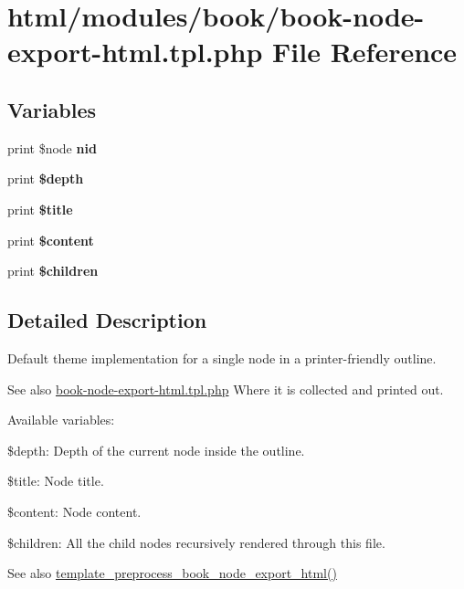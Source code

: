 \hypertarget{book-node-export-html_8tpl_8php}{
\section{html/modules/book/book-\/node-\/export-\/html.tpl.php File Reference}
\label{book-node-export-html_8tpl_8php}
}
\subsection*{Variables}
\begin{DoxyCompactItemize}
\item 
\hypertarget{book-node-export-html_8tpl_8php_aff83bc4c67cdf5b085d181488eea273f}{
print \$node {\bfseries nid}}
\label{book-node-export-html_8tpl_8php_aff83bc4c67cdf5b085d181488eea273f}

\item 
\hypertarget{book-node-export-html_8tpl_8php_a35f688394dd229d173c03c68c439f569}{
print {\bfseries \$depth}}
\label{book-node-export-html_8tpl_8php_a35f688394dd229d173c03c68c439f569}

\item 
\hypertarget{book-node-export-html_8tpl_8php_aec2795512d255332f57cacd930a090b4}{
print {\bfseries \$title}}
\label{book-node-export-html_8tpl_8php_aec2795512d255332f57cacd930a090b4}

\item 
\hypertarget{book-node-export-html_8tpl_8php_ab7b7210f43aa78e34f0b202de894a74c}{
print {\bfseries \$content}}
\label{book-node-export-html_8tpl_8php_ab7b7210f43aa78e34f0b202de894a74c}

\item 
\hypertarget{book-node-export-html_8tpl_8php_a82162d46cc50277bcd0aa897f1314edd}{
print {\bfseries \$children}}
\label{book-node-export-html_8tpl_8php_a82162d46cc50277bcd0aa897f1314edd}

\end{DoxyCompactItemize}


\subsection{Detailed Description}
Default theme implementation for a single node in a printer-\/friendly outline.

\begin{DoxySeeAlso}{See also}
\hyperlink{book-node-export-html_8tpl_8php}{book-\/node-\/export-\/html.tpl.php} Where it is collected and printed out.
\end{DoxySeeAlso}
Available variables:
\begin{DoxyItemize}
\item \$depth: Depth of the current node inside the outline.
\item \$title: Node title.
\item \$content: Node content.
\item \$children: All the child nodes recursively rendered through this file.
\end{DoxyItemize}

\begin{DoxySeeAlso}{See also}
\hyperlink{book_8module_acff8a6be50ab7378ef08da71ddd6b656}{template\_\-preprocess\_\-book\_\-node\_\-export\_\-html()} 
\end{DoxySeeAlso}
